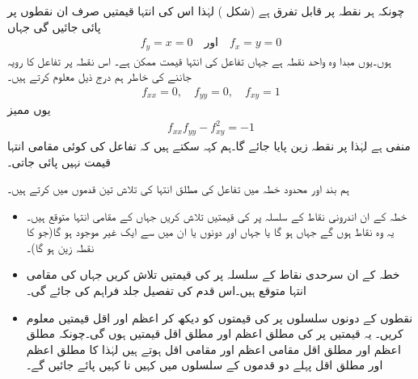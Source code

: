 چونکہ  ہر نقطہ پر قابل تفرق ہے  (شکل ) لہٰذا  اس کی انتہا قیمتیں صرف ان نقطوں پر پائی جائیں گی جہاں
\begin{align*}
f_y=x=0\quad\text{اور}\quad f_x=y=0
\end{align*}
ہوں۔یوں مبدا وہ واحد نقطہ ہے جہاں  تفاعل کی انتہا قیمت ممکن ہے۔ اس نقطہ پر تفاعل کا  رویہ  جاننے کی خاطر ہم درج ذیل معلوم کرتے ہیں۔
\begin{align*}
f_{xx}=0,\quad f_{yy}=0,\quad f_{xy}=1
\end{align*}
یوں ممیز
\begin{align*}
f_{xx}f_{yy}-f_{xy}^2=-1
\end{align*}
منفی ہے  لہٰذا  پر نقطہ زین پایا جائے گا۔ہم کہہ سکتے ہیں کہ  تفاعل  کی کوئی مقامی انتہا قیمت نہیں پائی جاتی۔

ہم بند اور  محدود خطہ  میں تفاعل  کی مطلق انتہا  کی تلاش تین قدموں میں کرتے ہیں۔
\begin{itemize}
\item[قدم 1:]
خطہ  کے  ان اندرونی نقاط کے سلسلہ پر  کی قیمتیں تلاش کریں جہاں  کے مقامی انتہا متوقع ہیں۔ یہ وہ نقاط ہوں گے جہاں   ہو گا  یا جہاں  اور  دونوں یا ان میں سے ایک  غیر موجود ہو  گا(جو  کا نقطہ زین ہو گا)۔ 
\item[قدم 2:]
خطہ   کے ان سرحدی نقاط کے سلسلہ پر   کی قیمتیں تلاش کریں جہاں  کی مقامی  انتہا  متوقع ہیں۔اس قدم کی تفصیل جلد فراہم کی جائے گی۔
\item[قدم 3:]
نقطوں کے دونوں سلسلوں  پر  کی قیمتوں  کو دیکھ کر اعظم  اور  اقل قیمتیں معلوم کریں۔ یہ قیمتیں  پر  کی مطلق اعظم اور مطلق اقل قیمتیں ہوں گی۔چونکہ مطلق اعظم اور مطلق اقل مقامی اعظم اور مقامی اقل ہوتے ہیں  لہٰذا     کا مطلق اعظم اور مطلق اقل  پہلے دو قدموں کے سلسلوں  میں کہیں نا کہیں پائے جائیں گے۔ 
\end{itemize}

